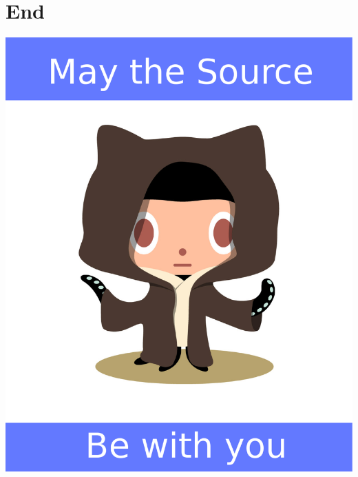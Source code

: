 \documentclass[style=husky,display=slidesnotes,clock]{powerdot}
\begin{document}
\section[tocsection=hidden,slide=false]{End}
\begin{emptyslide}{}
	\centering
	\includegraphics[scale=0.2]{octobiwan_source.eps}
\end{emptyslide}
\end{document}
